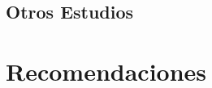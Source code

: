 \documentclass[10pt,a4paper]{moderncv}
\begin{document}
\subsection{Otros Estudios}

\section{Recomendaciones}
\cvline{}{\small }

\closesection{}                   %
\renewcommand{\listitemsymbol}{-} %



% 
\end{document}
